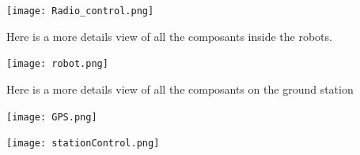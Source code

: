\begin{center}
\texttt{[image: Radio\_control.png]} 
\label{fig1}
\end{center}

Here is a more details view of all the composants inside the robots.

\begin{center}
\texttt{[image: robot.png]} 
\label{fig1}
\end{center}

Here is a more details view of all the composants on the ground station

\begin{center}
\texttt{[image: GPS.png]} 
\label{fig1}
\end{center}

\begin{center}
\texttt{[image: stationControl.png]} 
\label{fig1}
\end{center}